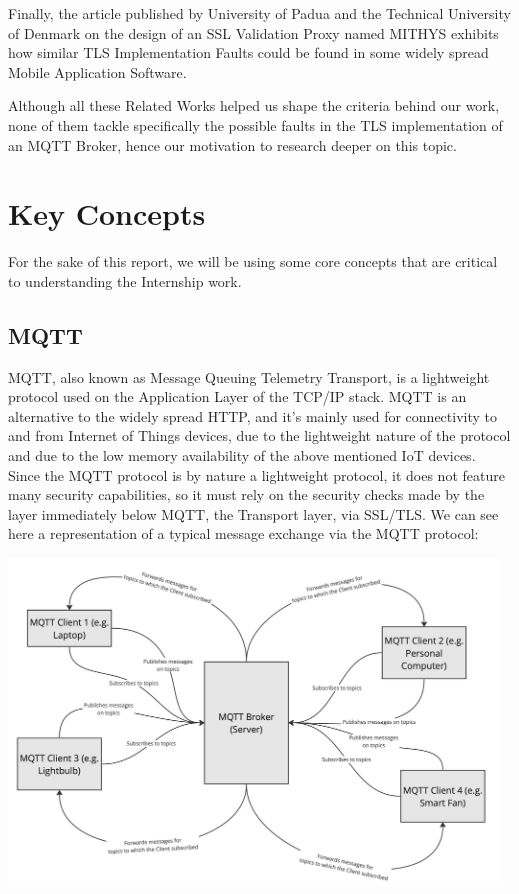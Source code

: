 \documentclass[binding=0.6cm,noexaminfo]{sapthesis}
\begin{document}
Finally, the article published by University of Padua and the Technical University of Denmark on the design of an SSL Validation Proxy named MITHYS \cite{mithys} exhibits how similar TLS Implementation Faults could be found in some widely spread Mobile Application Software.

Although all these Related Works helped us shape the criteria behind our work, none of them tackle specifically the possible faults in the TLS implementation of an MQTT Broker, hence our motivation to research deeper on this topic.

\section{Key Concepts}
For the sake of this report, we will be using some core concepts that are critical to understanding the Internship work.

\subsection{MQTT}
MQTT, also known as Message Queuing Telemetry Transport, is a lightweight protocol used on the Application Layer of the TCP/IP stack. MQTT is an alternative to the widely spread HTTP, and it’s mainly used for connectivity to and from Internet of Things devices, due to the lightweight nature of the protocol and due to the low memory availability of the above mentioned IoT devices.
Since the MQTT protocol is by nature a lightweight protocol, it does not feature many security capabilities, so it must rely on the security checks made by the layer immediately below MQTT, the Transport layer, via SSL/TLS.
We can see here a representation of a typical message exchange via the MQTT protocol:

\includegraphics[width=13cm]{MQTT}
\end{document}
